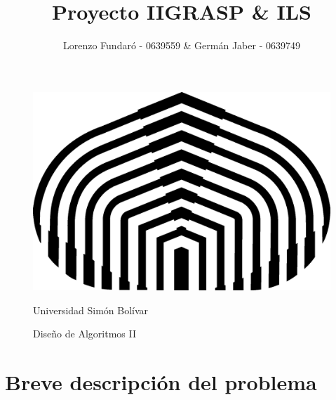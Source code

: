 \documentclass[letter,10pt]{article}
\title{Proyecto II}
\title{GRASP \& ILS}
\author{Lorenzo Fundar\'o - 0639559 \& Germán Jaber - 0639749}
\begin{document}
\begin{figure}[t]
\begin{center}
 \includegraphics[scale = 0.75]{usb.png}
\end{center}

\begin{center}
  \large Universidad Simón Bolívar
\end{center}
\begin{center}
  \large Diseño de Algoritmos II
\end{center}
\end{figure}
\maketitle

\thispagestyle{empty}
\newpage


\tableofcontents{}
\newpage

\section{Breve descripción del problema}
\end{document}
